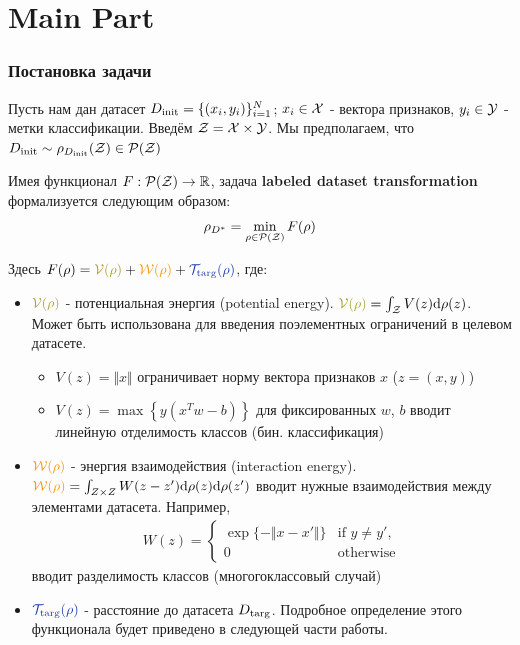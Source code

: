 \section{Main Part}

\subsubsection{Постановка задачи}

Пусть нам дан датасет $D_{\text{init}} = \{ (x_i, y_i) \}_{i = 1}^{N}$; $x_i \in \mathcal{X}$ - вектора признаков,  $y_i \in \mathcal{Y}$ - метки классификации. Введём $\mathcal{Z} = \mathcal{X} \times \mathcal{Y}$. Мы предполагаем, что $D_{\text{init}} \sim \rho_{D_{\text{init}}}(\mathcal{Z}) \in \mathcal{P}(\mathcal{Z})$

Имея функционал $F : \mathcal{P}(\mathcal{Z}) \rightarrow \mathbb{R}$, задача \textbf{labeled dataset transformation} формализуется следующим образом: 
\begin{gather*}
    \rho_{D^*} = \min\limits_{\rho \in \mathcal{P}(\mathcal{Z})} F(\rho)
\end{gather*}

Здесь $F(\rho) = \olive{\cV(\rho)} + \sunset{\cW(\rho)} + \twilight{\cT_{\targ}(\rho)}$, где:

\begin{itemize}
    \item $\olive{\cV(\rho)}$ - потенциальная энергия (potential energy). $\olive{\cV(\rho)} = \int_{\cZ}V(z) \dd \rho(z)$. Может быть использована для введения поэлементных ограничений в целевом датасете. 
    \begin{itemize}
        \item $V(z) = \Vert x \Vert$ ограничивает норму вектора признаков $x$ ($z = (x, y)$)
        \item $V(z) = \max\left\{ y(x^{T} w - b) \right\}$ для фиксированных $w$, $b$ вводит линейную отделимость классов (бин. классификация)
    \end{itemize}
    \item $\sunset{\cW(\rho)}$ - энергия взаимодействия (interaction energy). $\sunset{\cW(\rho)} = \int_{Z \times Z} W(z - z') \dd \rho(z) \dd \rho(z')$ вводит нужные взаимодействия между элементами датасета. Например, 
    \vspace{-2mm}
    \begin{gather*}
        W(z) = \begin{cases}\exp \{ - \Vert x - x' \Vert \} & \text{if } y \neq y', \\
        0 & \text{otherwise}\end{cases}
    \end{gather*}
    вводит разделимость классов (многогоклассовый случай)
    \item $\twilight{\cT_{\targ}(\rho)}$ - расстояние до датасета $D_{\text{targ}}$. Подробное определение этого функционала будет приведено в следующей части работы.
\end{itemize}

